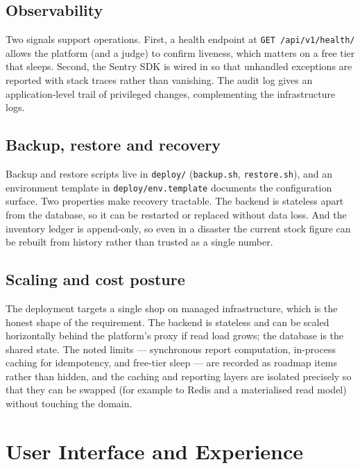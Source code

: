\documentclass[11pt,a4paper]{article}
\begin{document}
\subsection{Observability}

Two signals support operations. First, a health endpoint at \texttt{GET /api/v1/health/} allows the
platform (and a judge) to confirm liveness, which matters on a free tier that sleeps. Second, the
Sentry SDK is wired in so that unhandled exceptions are reported with stack traces rather than
vanishing. The audit log gives an application-level trail of privileged changes, complementing the
infrastructure logs.

\subsection{Backup, restore and recovery}

Backup and restore scripts live in \texttt{deploy/} (\texttt{backup.sh}, \texttt{restore.sh}), and an
environment template in \texttt{deploy/env.template} documents the configuration surface. Two
properties make recovery tractable. The backend is stateless apart from the database, so it can be
restarted or replaced without data loss. And the inventory ledger is append-only, so even in a
disaster the current stock figure can be rebuilt from history rather than trusted as a single number.

\subsection{Scaling and cost posture}

The deployment targets a single shop on managed infrastructure, which is the honest shape of the
requirement. The backend is stateless and can be scaled horizontally behind the platform's proxy if
read load grows; the database is the shared state. The noted limits --- synchronous report
computation, in-process caching for idempotency, and free-tier sleep --- are recorded as roadmap
items rather than hidden, and the caching and reporting layers are isolated precisely so that they can
be swapped (for example to Redis and a materialised read model) without touching the domain.

\section{User Interface and Experience}
\label{sec:ui}
\end{document}
